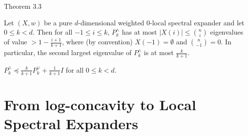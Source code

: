 \documentclass[10pt]{beamer}
\newcommand{\R}{\mathbb{R}}
\begin{document}
\begin{frame}{Theorem 3.3}
    \begin{theorem} 
        \vspace{2pt}
        Let $(X, w)$ be a pure $d$-dimensional weighted 0-local spectral expander and let $0 \leq k < d$. Then for all $-1 \leq i \leq k$, $P_k^\wedge$ has at most $|X(i)| \leq {n \choose i}$ eigenvalues of value $> 1 - \frac{i+1}{k+1}$, where (by convention) $X(-1) = \emptyset$ and ${n \choose -1} = 0$. In particular, the second largest eigenvalue of $P_k^\wedge$ is at most $\frac{k}{k+1}$. 
    \end{theorem}

    \begin{lemma}
        \vspace{2pt}
        $P_k^\wedge \preceq \frac{k}{k+1} P_k^\vee + \frac{1}{k+1}I$ for all $0 \leq k < d$.
    \end{lemma}
\end{frame}

\section{From log-concavity to Local Spectral Expanders}
\end{document}
